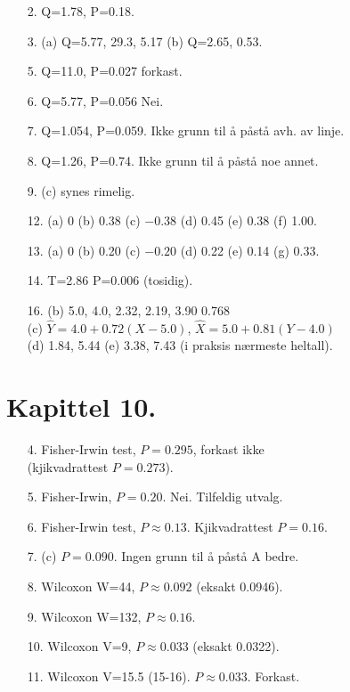 \begin{itemize}         
\item[2.]  Q=1.78,  P=0.18.
\item[3.]  (a) Q=5.77, 29.3, 5.17   (b) Q=2.65, 0.53.
\item[5.]  Q=11.0,  P=0.027  forkast.
\item[6.]  Q=5.77,  P=0.056  Nei.
\item[7.]  Q=1.054,  P=0.059.  Ikke grunn til å påstå avh. av linje.
\item[8.]  Q=1.26,  P=0.74.  Ikke grunn til å påstå noe annet.
\item[9.]  (c) synes rimelig.
\item[12.]  (a) 0  (b) 0.38  (c) $-0.38$  (d) 0.45  (e) 0.38  (f) 1.00.
\item[13.]  (a) 0  (b) 0.20  (c) $-0.20$  (d) 0.22  (e) 0.14  (g) 0.33.
\item[14.]  T=2.86  P=0.006 (tosidig).
\item[16.]  (b) 5.0, 4.0, 2.32, 2.19, 3.90 0.768\\
              (c) $\hat{Y}=4.0+0.72(X-5.0)$, $\hat{X}=5.0+0.81(Y-4.0)$\\
              (d) 1.84, 5.44  (e) 3.38, 7.43 (i praksis nærmeste heltall).
\end{itemize}         

\section*{Kapittel 10.}

\begin{itemize}         
\item[4.]  Fisher-Irwin test, $P=0.295$, forkast ikke\\
              (kjikvadrattest $P=0.273$).
\item[5.]  Fisher-Irwin, $P=0.20$.  Nei.  Tilfeldig utvalg.
\item[6.]  Fisher-Irwin test, $P\approx 0.13$.  Kjikvadrattest $P=0.16$.
\item[7.]  (c) $P=0.090$.  Ingen grunn til å påstå A bedre.
\item[8.]  Wilcoxon W=44, $P\approx 0.092$ (eksakt 0.0946).
\item[9.]  Wilcoxon W=132, $P\approx 0.16$.
\item[10.]  Wilcoxon V=9, $P\approx 0.033$ (eksakt 0.0322).
\item[11.]  Wilcoxon V=15.5 (15-16).  $P\approx 0.033$.  Forkast.
\end{itemize}                  
         
